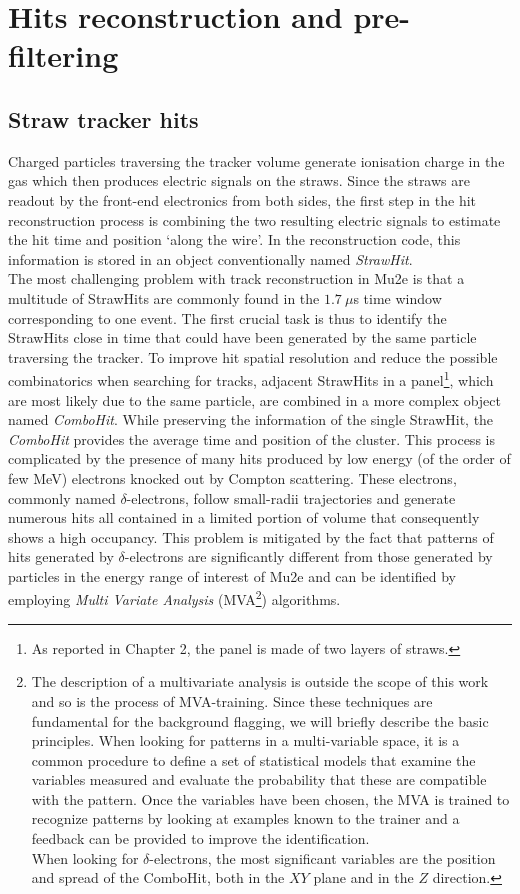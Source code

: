 \documentclass[12pt,a4paper,openright, oneside, titlepage]{book} %
\begin{document}
\section{Hits reconstruction and pre-filtering}
\subsection{Straw tracker hits}
Charged particles traversing the tracker volume generate ionisation charge in the gas
which then produces electric signals on the straws.
Since the straws are readout by the front-end electronics from both sides, 
the first step in the hit reconstruction process is combining the two resulting electric signals 
to estimate the hit time and position `along the wire'. 
In the reconstruction code, this information is stored in an object conventionally named \textit{StrawHit}.\\
The most challenging problem with track reconstruction in Mu2e 
is that a multitude of StrawHits are commonly found
in the  $1.7\ \mu$s time window corresponding to one event.
The first crucial task is thus to identify the StrawHits close in time 
that could have been generated by the same particle traversing the tracker.
To improve hit spatial resolution and reduce the possible combinatorics when searching for tracks, 
adjacent StrawHits in a panel\footnote{As reported in Chapter 2, the panel is made of two layers of straws.}, 
which are most likely due to the same particle, 
are combined in a more complex object named \textit{ComboHit}. 
While preserving the information of the single StrawHit, 
the \textit{ComboHit} provides the average time and position of the cluster. 
This process is complicated by the presence of many hits produced by low energy (of the order of few MeV) electrons 
knocked out by Compton scattering. These electrons, commonly named $\delta$-electrons, follow small-radii
trajectories and generate numerous hits all contained in a limited portion of volume that consequently 
shows a high occupancy. This problem is mitigated by the fact that
patterns of hits generated by $\delta$-electrons are significantly different from 
those generated by particles in the energy range
of interest of Mu2e and can be identified by employing \textit{Multi Variate Analysis} 
(MVA\footnote{The description of a multivariate analysis is outside the scope of this work and so is the process of MVA-training. Since these techniques are fundamental for the background flagging, we will briefly describe the basic principles.
When looking for patterns in a multi-variable space, it is a common procedure to define a set of statistical models that examine the variables measured and evaluate the probability that these are compatible with the pattern. 
Once the variables have been chosen, the MVA is trained to recognize patterns by looking at examples known to the trainer and a feedback can be provided to improve the identification.\\
When looking for $\delta$-electrons, the most significant variables are the position and spread of the ComboHit, both in the $XY$ plane and in the $Z$ direction.}) algorithms.\\
\end{document}

